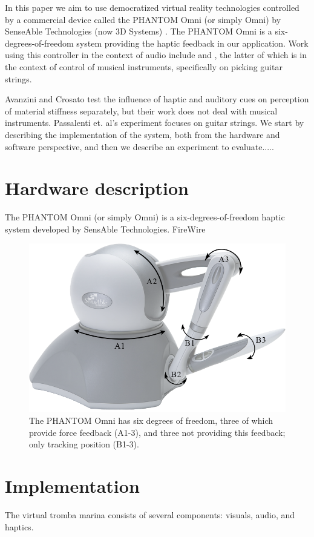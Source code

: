 \documentclass{article}
\begin{document}
In this paper we aim to use democratized virtual reality technologies controlled by a commercial device called the
 PHANTOM Omni (or simply Omni) by SenseAble Technologies (now 3D Systems) \cite{phantom}.
 The PHANTOM Omni is a six-degrees-of-freedom system providing the haptic feedback in our application. Work using this controller in the context of audio include \cite{avanzini2006} and \cite{passalenti2019}, the latter of which is in the context of control of musical instruments, specifically on picking guitar strings.

Avanzini and Crosato test the influence of haptic and auditory cues on perception of material stiffness separately, but their work does not deal with musical instruments. Passalenti et. al's experiment focuses on guitar strings.
We start by describing the implementation of the system, both from the hardware and software perspective, and then we describe an experiment to evaluate..... 


\section{Hardware description}
The PHANTOM Omni (or simply Omni) is a six-degrees-of-freedom haptic system developed by SensAble Technologies. FireWire
\begin{figure}[ht]\includegraphics[width=1.0\columnwidth]{figures/omniSchematic.png}
\centering
  \caption{The PHANTOM Omni has six degrees of freedom, three of which provide force feedback (A1-3), and three not providing this feedback; only tracking position (B1-3). \label{fig:omni}}
\end{figure}

\section{Implementation}
The virtual tromba marina consists of several components: visuals, audio, and haptics. 
\end{document}
